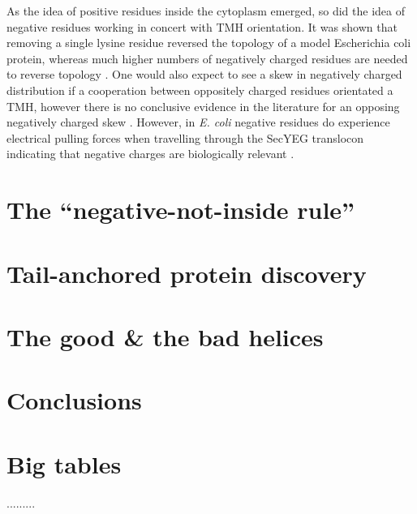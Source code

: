 \documentclass[12pt,PhD,twoside]{muthesis}
\begin{document}
As the idea of positive residues inside the cytoplasm emerged, so did the idea of negative residues working in concert with TMH orientation. It was shown that removing a single lysine residue reversed the topology of a model Escherichia coli protein, whereas much higher numbers of negatively charged residues are needed to reverse topology \cite{Nilsson1990}. One would also expect to see a skew in negatively charged distribution if a cooperation between oppositely charged residues orientated a TMH, however there is no conclusive evidence in the literature for an opposing negatively charged skew \cite{Granseth2005, Nilsson2005, Sharpe2010, Baeza-Delgado2013}. However, in {\it E. coli} negative residues do experience electrical pulling forces when travelling through the SecYEG translocon indicating that negative charges are biologically relevant \cite{Ismail2015}.

\chapter{The ``negative-not-inside rule''}

\chapter{Tail-anchored protein discovery}

\chapter{The good \& the bad helices}

\chapter{Conclusions}

\printbibliography[title={Bibliography}]

\appendix
\chapter{Big tables}
.........
\end{document}
